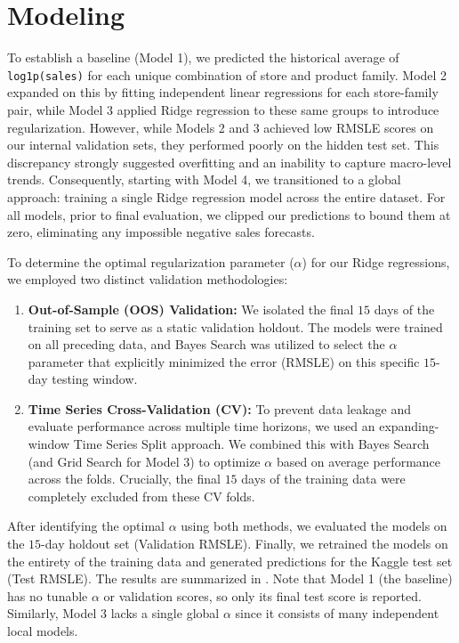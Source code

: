 \documentclass{article}
\begin{document}
\section{Modeling}

To establish a baseline (Model 1), we predicted the historical average of \texttt{log1p(sales)} for each unique combination of store and product family. Model 2 expanded on this by fitting independent linear regressions for each store-family pair, while Model 3 applied Ridge regression to these same groups to introduce regularization. However, while Models 2 and 3 achieved low RMSLE scores on our internal validation sets, they performed poorly on the hidden test set. This discrepancy strongly suggested overfitting and an inability to capture macro-level trends. Consequently, starting with Model 4, we transitioned to a global approach: training a single Ridge regression model across the entire dataset. For all models, prior to final evaluation, we clipped our predictions to bound them at zero, eliminating any impossible negative sales forecasts.

To determine the optimal regularization parameter ($\alpha$) for our Ridge regressions, we employed two distinct validation methodologies:
\begin{enumerate}
    \item \textbf{Out-of-Sample (OOS) Validation:} We isolated the final $15$ days of the training set to serve as a static validation holdout. The models were trained on all preceding data, and Bayes Search was utilized to select the $\alpha$ parameter that explicitly minimized the error (RMSLE) on this specific $15$-day testing window.
    \item \textbf{Time Series Cross-Validation (CV):} To prevent data leakage and evaluate performance across multiple time horizons, we used an expanding-window Time Series Split approach. We combined this with Bayes Search (and Grid Search for Model 3) to optimize $\alpha$ based on average performance across the folds. Crucially, the final $15$ days of the training data were completely excluded from these CV folds.
\end{enumerate}

After identifying the optimal $\alpha$ using both methods, we evaluated the models on the $15$-day holdout set (Validation RMSLE). Finally, we retrained the models on the entirety of the training data and generated predictions for the Kaggle test set (Test RMSLE). The results are summarized in . Note that Model 1 (the baseline) has no tunable $\alpha$ or validation scores, so only its final test score is reported. Similarly, Model 3 lacks a single global $\alpha$ since it consists of many independent local models.
\end{document}

